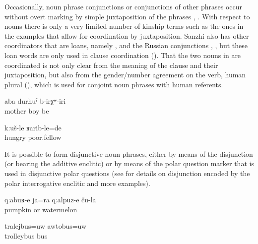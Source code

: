 Occasionally, noun phrase conjunctions or conjunctions of other phrases occur without overt marking by simple juxtaposition of the phrases , . With respect to nouns there is only a very limited number of kinship terms such as the ones in the examples  that allow for coordination by juxtaposition. Sanzhi also has other coordinators that are loans, namely  , and the Russian conjunctions  ,  , but these loan words are only used in clause coordination (). That the two nouns in  are coordinated is not only clear from the meaning of the clause and their juxtaposition, but also from the gender/number agreement on the verb, human plural (), which is used for conjoint noun phrases with human referents.
%
\begin{exe}
	\ex	\label{ex:There were mother and son}
	\gll	aba	durħuˁ	b-irχʷ-iri\\
		mother	boy	be\\
	\glt	{}

	\ex	\label{ex:‎They were hungry and poor}
	\gll	kːuš-le	ʁarib-le=de\\
		hungry	poor.fellow\\
	\glt	{}
\end{exe}

It is possible to form disjunctive noun phrases, either by means of the disjunction  (or  bearing the additive enclitic)  or by means of the polar question marker   that is used in disjunctive polar questions (see  for details on disjunction encoded by the polar interrogative enclitic and more examples).
%
\begin{exe}
	\ex	\label{ex:their pumpkins or watermelons}
	\gll	qːabuʁ-e	ja=ra	qːalpuz-e	ču-la\\
		pumpkin	or	watermelon	\\
	\glt	{}

	\ex	\label{ex:‎a trolleybus or a bus}
	\gll	tralejbus=uw		awtobus=uw	\\
		trolleybus	bus\\
	\glt	{}
\end{exe}

